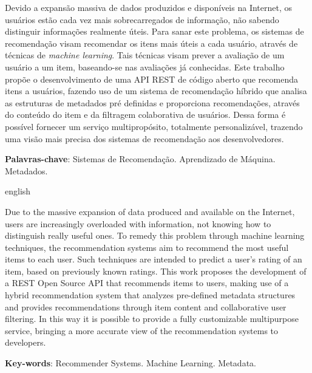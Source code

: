 \begin{resumo}
    \noindent

    Devido a expansão massiva de dados produzidos e disponíveis na Internet, os usuários estão cada vez mais sobrecarregados de informação, não sabendo distinguir informações realmente úteis. Para sanar este problema, os sistemas de recomendação visam recomendar os itens mais úteis a cada usuário, através de técnicas de \textit{machine learning}. Tais técnicas visam prever a avaliação de um usuário a um item, baseando-se nas avaliações já conhecidas. Este trabalho propõe o desenvolvimento de uma API REST de código aberto que recomenda itens a usuários, fazendo uso de um sistema de recomendação híbrido que analisa as estruturas de metadados pré definidas e proporciona recomendações, através do conteúdo do item e da filtragem colaborativa de usuários. Dessa forma é possível fornecer um serviço multipropósito, totalmente personalizável, trazendo uma visão mais precisa dos sistemas de recomendação aos desenvolvedores.

    \vspace{0.2cm}   
    \textbf{Palavras-chave}: Sistemas de Recomendação. Aprendizado de Máquina. Metadados.
\end{resumo}
 
\begin{resumo}[Abstract]	
\begin{otherlanguage*}{english}
    \noindent 
    
    Due to the massive expansion of data produced and available on the Internet, users are increasingly overloaded with information, not knowing how to distinguish really useful ones. To remedy this problem through machine learning techniques, the recommendation systems aim to recommend the most useful items to each user. Such techniques are intended to predict a user's rating of an item, based on previously known ratings. This work proposes the development of a REST Open Source API that recommends items to users, making use of a hybrid recommendation system that analyzes pre-defined metadata structures and provides recommendations through item content and collaborative user filtering. In this way it is possible to provide a fully customizable multipurpose service, bringing a more accurate view of the recommendation systems to developers.
    
    \vspace{0.2cm}
    \textbf{Key-words}: Recommender Systems. Machine Learning. Metadata.
\end{otherlanguage*}
\end{resumo}
